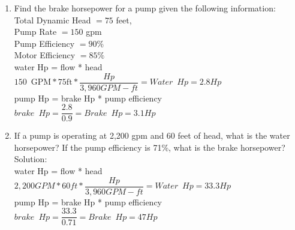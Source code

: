 \documentclass{article}
\begin{document}
\begin{enumerate}
  \item Find the brake horsepower for a pump given the following information:\\
   Total Dynamic Head $=75$ feet,\\
   Pump Rate $=150$ gpm\\
   Pump Efficiency $=90 \%$\\
   Motor Efficiency $=85 \%$\\
  \vspace{0.4cm}
water Hp = flow * head\\
$150 \enspace \mathrm{GPM}*75\mathrm{ft}*\dfrac{Hp}{3,960 GPM-ft}=\boxed{Water \enspace Hp = 2.8Hp}$\\
\vspace{0.4cm}
pump Hp = brake Hp * pump efficiency\\
$brake \enspace Hp = \dfrac{2.8}{0.9}=\boxed{Brake \enspace Hp=3.1Hp}$
 \vspace{0.2cm}
 
 
 


  \item If a pump is operating at 2,200 gpm and 60 feet of head, what is the water
horsepower? If the pump efficiency is 71\%, what is the brake horsepower?\\
  \vspace{0.2cm}
Solution:\\
\vspace{0.4cm}
water Hp = flow * head\\
$2,200GPM*60ft*\dfrac{Hp}{3,960 GPM-ft}=\boxed{Water \enspace Hp = 33.3Hp}$\\
\vspace{0.4cm}
pump Hp = brake Hp * pump efficiency\\
$brake \enspace Hp = \dfrac{33.3}{0.71}=\boxed{Brake \enspace Hp=47Hp}$
 \vspace{0.2cm}


\end{enumerate}
\end{document}
